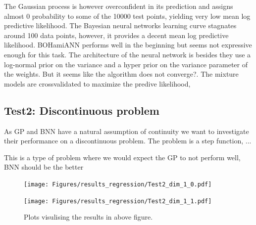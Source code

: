 The Gaussian process is however overconfident in its prediction and assigns
almost 0 probability to some of the 10000 test points, yielding very low mean log predictive
likelihood. The Bayesian neural networks learning curve stagnates around 100 data points, however,
it provides a decent mean log predictive likelihood. BOHamiANN performs well in the beginning 
but seems not expressive enough for this task. The architecture of the neural network is besides
they use a log-normal prior on the variance and a hyper prior on the variance parameter of the weights.
But it seems like the algorithm does not converge?. The mixture models are crossvalidated to maximize
the predive likelihood, 

\subsection*{Test2: Discontinuous problem}
As GP and BNN have a natural assumption of continuity we want to investigate their performance
on a discontinuous problem. The problem is a step function, ...


This is a type of problem where we would expect the GP to not perform well, 
BNN should be the better 

\begin{figure}[H]
  \centering
  \begin{minipage}[b]{0.49\textwidth}
   \texttt{[image: Figures/results\_regression/Test2\_dim\_1\_0.pdf]}
  \end{minipage}
  \hfill
  \begin{minipage}[b]{0.49\textwidth}
    \texttt{[image: Figures/results\_regression/Test2\_dim\_1\_1.pdf]}
   \end{minipage}
  \caption{Plots visulising the results in above figure.}
\end{figure}

